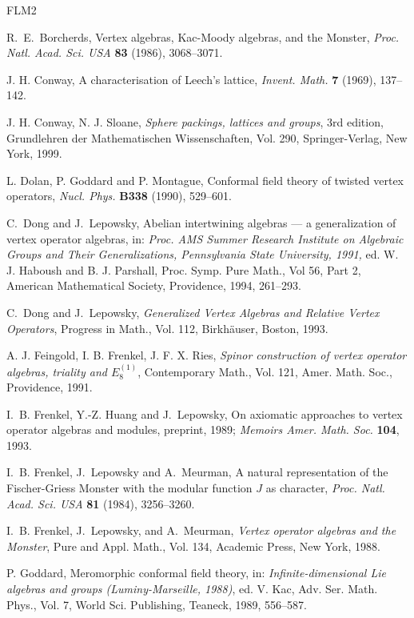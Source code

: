 \documentclass{amsproc}
\theoremstyle{definition}
\theoremstyle{remark}
\numberwithin{equation}{section}
\begin{document}
\begin{thebibliography}{FLM2}


R.~E.~Borcherds,
Vertex algebras, Kac-Moody algebras, and the Monster,
{\em Proc. Natl. Acad. Sci. USA} {\bf 83} (1986), 3068--3071.

J. H. Conway,
A characterisation of Leech's lattice, 
{\em Invent. Math.} {\bf 7} (1969), 137--142. 

J. H. Conway, N. J. Sloane, 
{\em Sphere packings, lattices and groups},
3rd edition, Grundlehren der Mathematischen Wissenschaften, Vol. 290, 
Springer-Verlag, New York, 1999. 


L. Dolan, P. Goddard and P. Montague, Conformal field theory of
twisted vertex operators, {\em Nucl. Phys.} {\bf B338} (1990),
529--601.

C.~Dong and J.~Lepowsky, Abelian intertwining algebras --- a generalization
of vertex operator algebras, in:
{\em Proc. AMS Summer Research Institute on Algebraic Groups
and Their Generalizations, Pennsylvania State University, 1991,}  ed.
W. J. Haboush and B. J. Parshall, Proc. Symp. Pure Math., 
Vol 56, Part 2, American Mathematical Society, Providence,
1994, 261--293.

C.~Dong and J.~Lepowsky, {\em Generalized Vertex Algebras and Relative
Vertex Operators}, Progress in Math., Vol. 112, Birkh\"{a}user,
Boston, 1993.

A. J. Feingold, I. B. Frenkel, J. F. X. Ries, {\em
Spinor construction of vertex
operator algebras, triality and $E_{8}^{(1)}$}, Contemporary Math.,
Vol. 121, Amer. Math. Soc., Providence, 1991.

I.~B. Frenkel, Y.-Z. Huang and J.~Lepowsky,
On axiomatic approaches to vertex operator algebras and modules,
preprint, 1989;
{\em Memoirs Amer. Math. Soc.} {\bf 104}, 1993.


I.~B. Frenkel, J.~Lepowsky and A.~Meurman,
A natural representation of the Fischer-Griess Monster with
the modular function $J$ as character,
{\em Proc. Natl. Acad. Sci. USA} {\bf 81} (1984),
3256--3260.

I.~B. Frenkel, J.~Lepowsky, and A.~Meurman,
{\em Vertex operator algebras and the Monster},
Pure and Appl. Math., Vol. 134, Academic Press, New York, 1988.

P. Goddard, Meromorphic conformal field theory,
in: {\em Infinite-dimensional Lie algebras and
groups (Luminy-Marseille, 1988)}, ed. V. Kac, Adv. Ser. Math. Phys., 
Vol. 7, World Sci. Publishing, Teaneck,  1989, 556--587.



\end{thebibliography}
\end{document}
